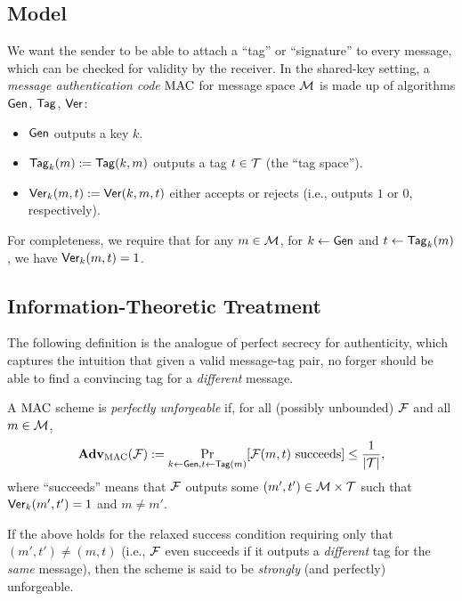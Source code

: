 \documentclass[11pt]{article}
\begin{document}
\subsection{Model}
\label{sec:model}

We want the sender to be able to attach a ``tag'' or ``signature'' to
every message, which can be checked for validity by the receiver.  In
the shared-key setting, a \emph{message authentication code} $\text{MAC}$
for message space $\mathcal{M}$ is made up of algorithms $\mathsf{Gen}$,
$\mathsf{Tag}$, $\mathsf{Ver}$:
\begin{itemize}
\item $\mathsf{Gen}$ outputs a key $k$.
\item $\mathsf{Tag}_k(m) := \mathsf{Tag}(k,m)$ outputs a tag $t \in \mathcal{T}$
  (the ``tag space'').
\item $\mathsf{Ver}_k(m,t) := \mathsf{Ver}(k,m,t)$ either accepts or rejects
  (i.e., outputs $1$ or $0$, respectively).
\end{itemize}

For completeness, we require that for any $m \in \mathcal{M}$, for $k
\gets \mathsf{Gen}$ and $t \gets \mathsf{Tag}_{k}(m)$, we have
$\mathsf{Ver}_{k}(m,t)=1$.

\subsection{Information-Theoretic Treatment}
\label{sec:inform-theor}

The following definition is the analogue of perfect secrecy for
authenticity, which captures the intuition that given a valid
message-tag pair, no forger should be able to find a convincing tag
for a \emph{different} message.

\begin{definition}
  \label{def:perfect-unforg}
  A $\text{MAC}$ scheme is \emph{perfectly unforgeable} if, for all
  (possibly unbounded) $\mathcal{F}$ and all $m \in \mathcal{M}$,
  \[ \mathbf{Adv}_{\text{MAC}}(\mathcal{F}) := \Pr_{k \gets \mathsf{Gen}, t \gets
    \mathsf{Tag}(m)}[\mathcal{F}(m, t) \text{ succeeds}] \leq
  \frac{1}{\lvert\mathcal{T}\rvert}, \] where ``succeeds'' means that $\mathcal{F}$
  outputs some $(m',t') \in \mathcal{M} \times \mathcal{T}$ such that
  $\mathsf{Ver}_{k}(m',t') = 1$ and $m \neq m'$.

  If the above holds for the relaxed success condition requiring only
  that $(m',t') \neq (m,t)$ (i.e., $\mathcal{F}$ even succeeds if it outputs
  a \emph{different} tag for the \emph{same} message), then the scheme
  is said to be \emph{strongly} (and perfectly) unforgeable.
\end{definition}
\end{document}

